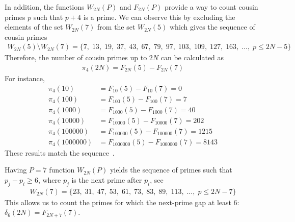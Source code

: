 In addition, the functions $W_{2N}(P)$ and $F_{2N}(P)$ provide a way to count cousin
primes $p$ such that $p+4$ is a prime.
We can observe this by excluding the elements of the set $W_{2N}(7)$ from the set $W_{2N}(5)$ which gives
the sequence of cousin primes~\cite{oeis:A023200}
\begin{align*}
    W_{2N}(5) \setminus W_{2N}(7) = \{ 7, \; 13, \; 19, \; 37, \; 43, \; 67, \; 79, \; 97, \; 103, \; 109, \; 127, \; 163, \; \dots, \;  p \leq 2N - 5 \}
\end{align*}
Therefore, the number of cousin primes up to $2N$ can be calculated as
\begin{align*}
    \pi_4 (2N) = F_{2N}(5) - F_{2N}(7)
\end{align*}
For instance,
\begin{align*}
    \pi_4 (10) &= F_{10}(5) - F_{10}(7) = 0 \\
    \pi_4 (100) &= F_{100}(5) - F_{100}(7) = 7 \\
    \pi_4 (1000) &= F_{1000}(5) - F_{1000}(7) = 40 \\
    \pi_4 (10000) &= F_{10000}(5) - F_{10000}(7) = 202 \\
    \pi_4 (100000) &= F_{100000}(5) - F_{100000}(7) = 1215 \\
    \pi_4 (1000000) &= F_{1000000}(5) - F_{1000000}(7) = 8143
\end{align*}
These results match the sequence~\cite{oeis:A093737}.

Having $P=7$ function $W_{2N}(P)$ yields the sequence of primes such that $p_j-p_i \geq 6$,
where $p_j$ is the next prime after $p_i$, see~\cite{oeis:A124582}
\begin{align*}
    W_{2N}(7) = \{ 23, \; 31, \;  47, \; 53, \; 61, \;  73, \; 83, \; 89, \; 113, \; \dots, \; p \leq 2N-7 \}
\end{align*}
This allows us to count the primes for which the next-prime gap at least 6: $\delta_6(2N) = F_{2N+7}(7)$.
